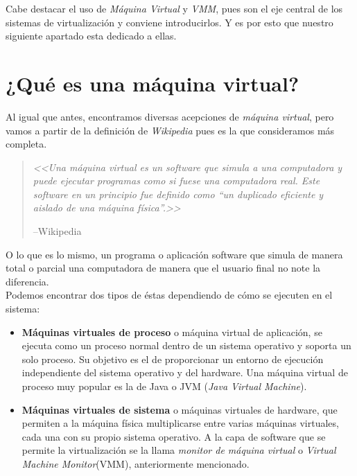 \noindent Cabe destacar el uso de  \emph{Máquina Virtual} y \emph{VMM}, pues son el eje central de los sistemas de virtualización y conviene introducirlos. Y es por esto que nuestro siguiente apartado esta dedicado a ellas.

\section{¿Qué es una máquina virtual?}

\noindent Al igual que antes, encontramos diversas acepciones de \emph{máquina virtual}, pero vamos a partir de la definición de \emph{Wikipedia} pues es la que consideramos más completa.

\begin{quote}
\emph{<<Una máquina virtual es un software que simula a una computadora y puede ejecutar programas como si fuese una computadora real. Este software en un principio fue definido como \textquotedblleft un duplicado eficiente y aislado de una máquina física\textquotedblright.>>}
\begin{flushright}
--Wikipedia\cite{defmaqvirwiki}
\end{flushright}
\end{quote}

\noindent O lo que es lo mismo, un programa o aplicación software que simula de manera total o parcial una computadora de manera que el usuario final no note la diferencia.\\

\noindent Podemos encontrar dos tipos de éstas dependiendo de cómo se ejecuten en el sistema:

\begin{itemize}
\item \textbf{Máquinas virtuales de proceso} o máquina virtual de aplicación, se ejecuta como un proceso normal dentro de un sistema operativo y soporta un solo proceso. Su objetivo es el de proporcionar un entorno de ejecución independiente del sistema operativo y del hardware. Una máquina virtual de proceso muy popular es la de Java o JVM (\emph{Java Virtual Machine}).
\item \textbf{Máquinas virtuales de sistema} o máquinas virtuales de hardware, que permiten a la máquina física multiplicarse entre varias máquinas virtuales, cada una con su propio sistema operativo. A la capa de software que se permite la virtualización se la llama \emph{monitor de máquina virtual} o \emph{Virtual Machine Monitor}(VMM), anteriormente mencionado.
\end{itemize}

